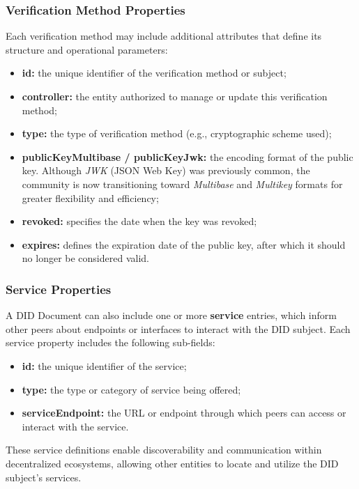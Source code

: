 \subsubsection *{Verification Method Properties}
Each verification method may include additional attributes that define its structure and operational parameters:

\begin{itemize}
    \item \textbf{id:} the unique identifier of the verification method or subject;
    \item \textbf{controller:} the entity authorized to manage or update this verification method;
    \item \textbf{type:} the type of verification method (e.g., cryptographic scheme used);
    \item \textbf{publicKeyMultibase / publicKeyJwk:} the encoding format of the public key.  
    Although \textit{JWK} (JSON Web Key) was previously common, the community is now transitioning toward \textit{Multibase} and \textit{Multikey} formats for greater flexibility and efficiency;
    \item \textbf{revoked:} specifies the date when the key was revoked;
    \item \textbf{expires:} defines the expiration date of the public key, after which it should no longer be considered valid.
\end{itemize}

\subsubsection*{Service Properties}
A DID Document can also include one or more \textbf{service} entries, which inform other peers about endpoints or interfaces to interact with the DID subject.  
Each service property includes the following sub-fields:

\begin{itemize}
    \item \textbf{id:} the unique identifier of the service;
    \item \textbf{type:} the type or category of service being offered;
    \item \textbf{serviceEndpoint:} the URL or endpoint through which peers can access or interact with the service.
\end{itemize}

\noindent
These service definitions enable discoverability and communication within decentralized ecosystems, allowing other entities to locate and utilize the DID subject’s services.

